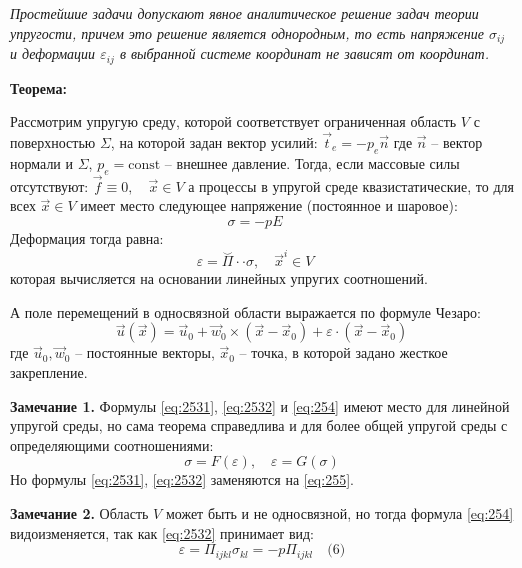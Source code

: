 

\textit{Простейшие задачи допускают явное аналитическое решение задач теории упругости, причем это решение является однородным, то есть напряжение \( \sigma_{ij} \) и деформации \( \varepsilon_{ij} \) в выбранной системе координат не зависят от координат.
}
\par
\textbf{Теорема:}

Рассмотрим упругую среду, которой соответствует ограниченная область \( V \) с поверхностью \( \Sigma \), на которой задан вектор усилий: $\vec{t}_e = - p_e \vec{n}$
где \( \vec{n} \) – вектор нормали и \( \Sigma \), \( p_e = \text{const} \) – внешнее давление.
Тогда, если массовые силы отсутствуют: $\vec{f} \equiv 0, \quad \vec{x} \in V $
а процессы в упругой среде квазистатические, то для всех \( \vec{x} \in V \) имеет место следующее напряжение (постоянное и шаровое):
\begin{equation}
\sigma = - p E \quad \label{eq:2531}
\end{equation}
Деформация тогда равна:
\begin{equation}
\varepsilon = \overset{\smallsmile}{\Pi} \cdot \cdot \sigma, \quad \vec{x}^i \in V \quad \label{eq:2532}
\end{equation}
которая вычисляется на основании линейных упругих соотношений.

А поле перемещений в односвязной области выражается по формуле Чезаро:
\begin{equation}
\vec{u}(\vec{x}) = \vec{u}_0 + \vec{w}_0 \times (\vec{x} - \vec{x}_0) + \varepsilon \cdot (\vec{x} - \vec{x}_0) 
\label{eq:254}
\end{equation}
где \( \vec{u}_0, \vec{w}_0 \) – постоянные векторы, \( \vec{x}_0 \) – точка, в которой задано жесткое закрепление.

\textbf{Замечание 1.} Формулы \ref{eq:2531}, \ref{eq:2532} и \ref{eq:254} имеют место для линейной упругой среды, но сама теорема справедлива и для более общей упругой среды с определяющими соотношениями:
\begin{equation}
\sigma = F(\varepsilon), \quad \varepsilon = G(\sigma) \label{eq:255}
\end{equation}
Но формулы \ref{eq:2531}, \ref{eq:2532} заменяются на \ref{eq:255}.

\textbf{Замечание 2.} Область \( V \) может быть и не односвязной, но тогда формула \ref{eq:254}  видоизменяется, так как \ref{eq:2532} принимает вид:
\begin{equation}
\varepsilon = \Pi_{ijkl} \sigma_{kl} = - p \Pi_{ijkl} \quad \text{(6)}
\end{equation}

